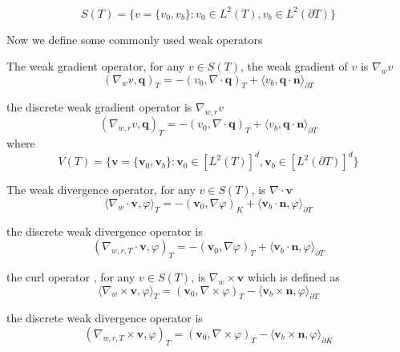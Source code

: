 \begin{equation}
S(T) = \{ v = \{v_{0}, v_{b}\} : v_{0} \in L^{2}(T), v_{b} \in L^{2} (\partial T) \}
\end{equation}

Now we define some commonly used weak operators

The weak gradient operator, for any $ v \in S(T) $, the weak gradient of $ v $ is $ \nabla_{w} v $
\begin{equation}
( \nabla_{w} v, \mathbf{q} )_{T} = -(v_{0}, \nabla \cdot \mathbf{q})_{T} + \langle v_{b}, \mathbf{q} \cdot \mathbf{n} \rangle_{\partial T}
\end{equation}

the discrete weak gradient operator is $ \nabla_{w, r} v $
\begin{equation}
(\nabla_{w,r} v, \mathbf{q})_{T} = -(v_{0}, \nabla \cdot \mathbf{q})_{T} + \langle v_{b}, \mathbf{q} \cdot \mathbf{n} \rangle_{\partial T}
\end{equation}
where
\begin{equation}
V(T) = \{ \mathbf{v} = \{  \mathbf{v}_{0}, \mathbf{v}_{b} \} : \mathbf{v}_{0} \in [L^{2} (T)]^{d}, \mathbf{v}_{b} \in [L^{2} (\partial T)]^{d} \}
\end{equation}

The weak divergence operator, for any $ v \in S(T) $, is $ \nabla \cdot \mathbf{v} $
\begin{equation}
\langle \nabla_{w} \cdot \mathbf{v}, \varphi \rangle_{T} = -(\mathbf{v}_{0}, \nabla \varphi)_{K} + \langle \mathbf{v}_{b} \cdot \mathbf{n}, \varphi \rangle_{\partial T}
\end{equation}

the discrete weak divergence operator is 
\begin{equation}
(\nabla_{w, r, T} \cdot \mathbf{v}, \varphi)_{T} = -(\mathbf{v}_{0}, \nabla \varphi)_{T} + \langle \mathbf{v}_{b} \cdot \mathbf{n}, \varphi \rangle_{\partial T}
\end{equation}

the curl operator , for any $ v \in S(T) $, is $ \nabla_{w} \times \mathbf{v}$ which is defined as 
\begin{equation}
\langle \nabla_{w} \times \mathbf{v}, \varphi \rangle_{T} = (\mathbf{v}_{0}, \nabla \times \varphi)_{T} - \langle \mathbf{v}_{b} \times \mathbf{n}, \varphi \rangle_{\partial T}
\end{equation}

the discrete weak divergence operator is 
\begin{equation}
(\nabla_{w, r, T} \times \mathbf{v}, \varphi)_{T} = (\mathbf{v}_{0}, \nabla \times \varphi)_{T} - \langle \mathbf{v}_{b} \times \mathbf{n}, \varphi \rangle_{\partial K}
\end{equation}

